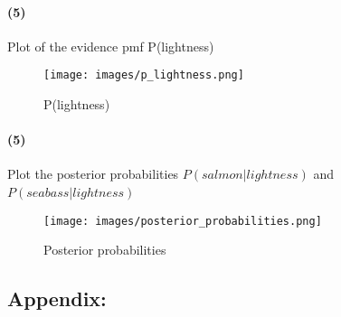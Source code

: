 \documentclass[a4paper]{article}
\begin{document}
%
%
\paragraph{(5) } Plot of the evidence pmf P(lightness) ~\\
\begin{figure}[h!]
  \centering
    \texttt{[image: images/p\_lightness.png]}
  \caption{P(lightness)}
\end{figure}

%
%
\paragraph{(5) } Plot the posterior probabilities $P(salmon|lightness)$ and $P(seabass|lightness)$ ~\\
\begin{figure}[h!]
  \centering
    \texttt{[image: images/posterior\_probabilities.png]}
  \caption{Posterior probabilities}
\end{figure}

\newpage
\subsection*{Appendix:}

\end{document}
